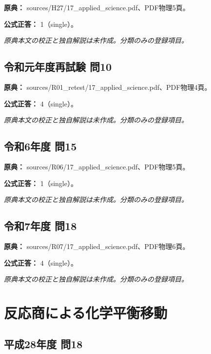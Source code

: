\noindent\textbf{原典：} sources/H27/17\_applied\_science.pdf、PDF物理5頁。

\textbf{公式正答：} 1（single）。

\par\textit{原典本文の校正と独自解説は未作成。分類のみの登録項目。}

\subsection{令和元年度再試験 問10}
\label{q:r01-ret-applied-10}

\noindent\textbf{原典：} sources/R01\_retest/17\_applied\_science.pdf、PDF物理4頁。

\textbf{公式正答：} 4（single）。

\par\textit{原典本文の校正と独自解説は未作成。分類のみの登録項目。}

\subsection{令和6年度 問15}
\label{q:r06-reg-applied-15}

\noindent\textbf{原典：} sources/R06/17\_applied\_science.pdf、PDF物理5頁。

\textbf{公式正答：} 1（single）。

\par\textit{原典本文の校正と独自解説は未作成。分類のみの登録項目。}

\subsection{令和7年度 問18}
\label{q:r07-reg-applied-18}

\noindent\textbf{原典：} sources/R07/17\_applied\_science.pdf、PDF物理6頁。

\textbf{公式正答：} 4（single）。

\par\textit{原典本文の校正と独自解説は未作成。分類のみの登録項目。}

\section{反応商による化学平衡移動}

\subsection{平成28年度 問18}
\label{q:h28-reg-applied-18}

